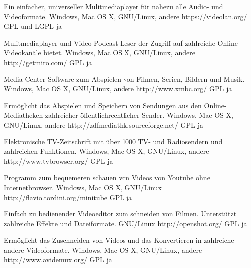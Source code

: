 \documentclass[11pt,a4paper,landscape,twocolumn]{article}
\begin{document}


{Ein einfacher, universeller Mulitmediaplayer für nahezu alle Audio- und Videoformate.}
{Windows, Mac OS X, GNU/Linux, andere}
{https://videolan.org/}
{GPL und LGPL}
{ja}

{Mulitmediaplayer und Video-Podcast-Leser der Zugriff auf zahlreiche Online-Videokanäle bietet.}
{Windows, Mac OS X, GNU/Linux, andere}
{http://getmiro.com/}
{GPL}
{ja}

{Media-Center-Software zum Abspielen von Filmen, Serien, Bildern und Musik.}
{Windows, Mac OS X, GNU/Linux, andere}
{http://www.xmbc.org/}
{GPL}
{ja}

{Ermöglicht das Abspielen und Speichern von Sendungen aus den Online-Mediatheken zahlreicher öffentlichrechtlicher Sender.}
{Windows, Mac OS X, GNU/Linux, andere}
{http://zdfmediathk.sourceforge.net/}
{GPL}
{ja}


\newpage %


{Elektronische TV-Zeitschrift mit über 1000 TV- und Radiosendern und zahlreichen Funktionen.}
{Windows, Mac OS X, GNU/Linux, andere}
{http://www.tvbrowser.org/}
{GPL}
{ja}

{Programm zum bequemeren schauen von Videos von Youtube ohne Internetbrowser.}
{Windows, Mac OS X, GNU/Linux}
{http://flavio.tordini.org/minitube}
{GPL}
{ja}

{Einfach zu bedienender Videoeditor zum schneiden von Filmen. Unterstützt zahlreiche Effekte und Dateiformate.}
{GNU/Linux}
{http://openshot.org/}
{GPL}
{ja}

{Ermöglicht das Zuschneiden von Videos und das Konvertieren in zahlreiche andere Videoformate.}
{Windows, Mac OS X, GNU/Linux, andere}
{http://www.avidemux.org/}
{GPL}
{ja}
\end{document}
